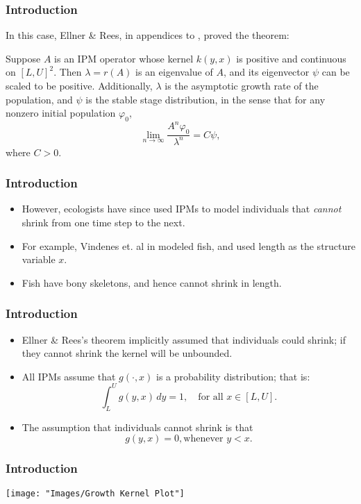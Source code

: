 \documentclass{beamer}
\begin{document}
\begin{frame}
	\frametitle{Introduction}
		In this case, Ellner \& Rees, in appendices to \cite{Ellner2006}, proved the theorem:
	\pause
	\begin{theorem}
		Suppose $A$ is an IPM operator whose kernel $k(y, x)$ is positive and continuous on $[L, U]^2$. Then $\lambda = r(A)$ is an eigenvalue of $A$, and its eigenvector $\psi$ can be scaled to be positive. Additionally, $\lambda$ is the asymptotic growth rate of the population, and $\psi$ is the stable stage distribution, in the sense that for any nonzero initial population $\varphi_0$,
		\[\lim_{n \to \infty} \frac{A^n \varphi_0}{\lambda^n} = C \psi, \]
		where $C>0$.
	\end{theorem}
\end{frame}

\begin{frame}
	\frametitle{Introduction}
	\begin{itemize}
		\item However, ecologists have since used IPMs to model individuals that \emph{cannot} shrink from one time step to the next.
		\pause
		\item For example, Vindenes et. al in \cite{Vindenes2014} modeled fish, and used length as the structure variable $x$.
		\pause
		\item Fish have bony skeletons, and hence cannot shrink in length.
	\end{itemize}
\end{frame}

\begin{frame}
	\frametitle{Introduction}
	\begin{itemize}
		\item Ellner \& Rees's theorem implicitly assumed that individuals could shrink; if they cannot shrink the kernel will be unbounded.
		\pause
		\item All IPMs assume that $g(\cdot, x)$ is a probability distribution; that is:
		\[\int_L^U g(y, x) \, dy = 1, \quad \text{for all } x \in [L,U].\]
		\pause
		\item The assumption that individuals cannot shrink is that
		\[g(y, x) = 0, \text{whenever } y < x.\]
	\end{itemize}
\end{frame}

\begin{frame}
	\frametitle{Introduction}
\begin{center}
	\texttt{[image: "Images/Growth Kernel Plot"]}
\end{center}
\end{frame}
\end{document}

